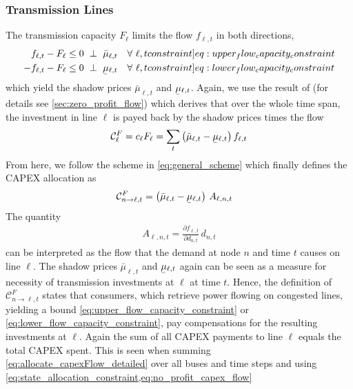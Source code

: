 \documentclass[11pt,twocolumn]{article}
\newcommand{\ubar}[1]{\underaccent{\bar}{#1}}
\newcommand{\resultsin}[1]{\hspace{6pt} \bot  \hspace{6pt} #1}
\newcommand{\Forall}[1]{\hspace{10pt} \forall \,\, #1 }
\newcommand{\pdv}[2]{\frac{\partial #1}{\partial #2}}
\newcommand{\flow}{f_{\ell,t}}
\newcommand{\capacityflow}{F_{\ell}}
\newcommand{\capitalpriceflow}{c_{\ell}}
\newcommand{\mulowerflow}{\ubar{\mu}_{\ell,t}}
\newcommand{\muupperflow}{\bar{\mu}_{\ell,t}}
\newcommand{\demand}[1][n]{d_{#1,t}}
\newcommand{\capexflow}{\mathcal{C}^F}
\newcommand{\allocateflow}[1][n]{A_{\ell,#1,t}}
\newcommand{\allocatecapexflow}[1][n \rightarrow \ell]{\capexflow_{#1,t}}
\begin{document}
\subsubsection{Transmission Lines}

The transmission capacity $\capacityflow$ limits the flow $\flow$ in both directions,
\begin{align}
\flow - \capacityflow &\le 0 \resultsin{\muupperflow} \Forall{\ell,t} 
\label[constraint]{eq:upper_flow_capacity_constraint} \\
- \flow - \capacityflow &\le 0 \resultsin{\mulowerflow} \Forall{\ell,t} 
\label[constraint]{eq:lower_flow_capacity_constraint}
\end{align}
which yield the shadow prices $\muupperflow$ and $\mulowerflow$. Again, we use the result of \cite{brown_decreasing_2020} (for details see \cref{sec:zero_profit_flow}) which derives that over the whole time span, the investment in line $\ell$ is payed back by the shadow prices times the flow 
\begin{align}
\capexflow_\ell = \capitalpriceflow \capacityflow = \sum_{t} \left( \muupperflow - \mulowerflow \right)  \flow 
\label{eq:no_profit_capex_flow}
\end{align}
From here, we follow the scheme in \cref{eq:general_scheme} which finally defines the CAPEX allocation as 
\begin{align}
    \allocatecapexflow &=  
   \left( \muupperflow - \mulowerflow\right) \, \allocateflow
   \label{eq:allocate_capexFlow_detailed}
\end{align}
The quantity 
\begin{align}
 \allocateflow =  \pdv{\flow}{\demand}\, \demand
\end{align}
can be interpreted as the flow that the demand at node $n$ and time $t$ causes on line $\ell$.
The  shadow prices $\muupperflow$ and $\mulowerflow$ again can be seen as a measure for necessity of transmission investments at $\ell$ at time $t$. Hence, the definition of $\allocatecapexflow$ states that consumers, which retrieve power flowing on congested lines, yielding a bound \cref{eq:upper_flow_capacity_constraint} or \eqref{eq:lower_flow_capacity_constraint}, pay compensations for the resulting investments at $\ell$. Again the sum of all CAPEX payments to line $\ell$ equals the total CAPEX spent. This is seen when summing \cref{eq:allocate_capexFlow_detailed} over all buses and time steps and using \cref{eq:state_allocation_constraint,eq:no_profit_capex_flow}
\end{document}
